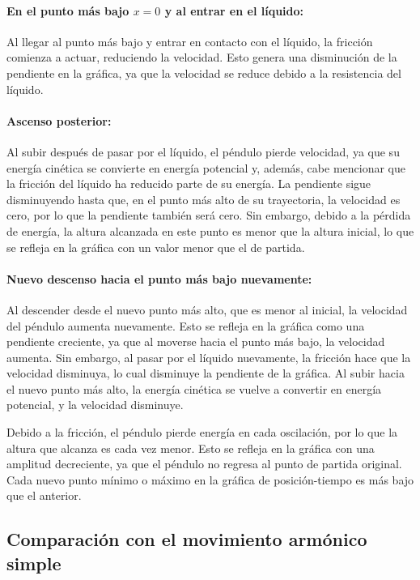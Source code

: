 \documentclass[twocolumn]{article}
\numberwithin{table}{section}
\begin{document}
\paragraph{En el punto más bajo $x=0$ y al entrar en el líquido:} Al llegar al
punto más bajo y entrar en contacto con el líquido, la fricción
comienza a actuar, reduciendo la velocidad. Esto genera una
disminución de la pendiente en la gráfica, ya que la velocidad se
reduce debido a la resistencia del líquido.

\paragraph{Ascenso posterior:} Al subir después de pasar por el líquido, el
péndulo pierde velocidad, ya que su energía cinética se
convierte en energía potencial y, además, cabe mencionar que la
fricción del líquido ha reducido parte de su energía. La pendiente
sigue disminuyendo hasta que, en el punto más alto de su trayectoria,
la velocidad es cero, por lo que la pendiente también será cero. Sin
embargo, debido a la pérdida de energía, la altura alcanzada en este
punto es menor que la altura inicial, lo que se refleja en la gráfica
con un valor menor que el de partida.

\paragraph{Nuevo descenso hacia el punto más bajo nuevamente:} Al
descender desde el nuevo punto más alto, que es menor al inicial, la
velocidad del péndulo aumenta nuevamente. Esto se refleja en la
gráfica como una pendiente creciente, ya que al moverse hacia el
punto más bajo, la velocidad aumenta. Sin embargo, al pasar por el
líquido nuevamente, la fricción hace que la velocidad disminuya, lo
cual disminuye la pendiente de la gráfica. Al subir hacia el nuevo
punto más alto, la energía cinética se vuelve a convertir en energía
potencial, y la velocidad disminuye.

Debido a la fricción, el péndulo pierde energía en cada oscilación,
por lo que la altura que alcanza es cada vez menor. Esto se refleja
en la gráfica con una amplitud decreciente, ya que el péndulo no
regresa al punto de partida original. Cada nuevo punto mínimo o
máximo en la gráfica de posición-tiempo es más bajo que el anterior.

\subsection{Comparación con el movimiento armónico simple}
\end{document}
